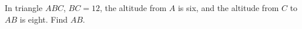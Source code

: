 In triangle $ABC$, $BC=12$, the altitude from $A$ is six, and the altitude from $C$ to $AB$ is eight. Find $AB$.
